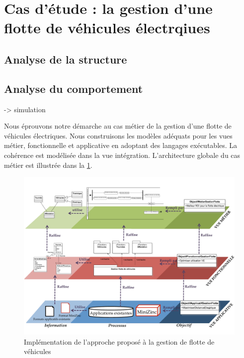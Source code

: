 \section{Cas d'étude : la gestion d'une flotte de véhicules électrqiues}

    \subsection{Analyse de la structure}


    \subsection{Analyse du comportement}
    -> simulation 

Nous éprouvons notre démarche au cas métier de la gestion d'une flotte de véhicules électriques. Nous construisons les modèles adéquats pour les vues métier, fonctionnelle et applicative en adoptant des langages exécutables. La cohérence est modélisée dans la vue intégration. L'architecture globale du cas métier est illustrée dans la \ref{fig:architecture_generale_usecase}.


\begin{figure}[!htbp]
 \begin{center}
  \includegraphics[angle=90, width=1\textwidth]{figures/5_implementation/architecture_generale_usecase.pdf}
 \end{center}
 \caption{Implémentation de l'approche proposé à la gestion de flotte de véhicules}
 \label{fig:architecture_generale_usecase}
\end{figure}


